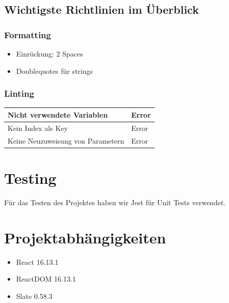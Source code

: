 \documentclass[a4paper, titlepage]{article}
\begin{document}
  \subsection{Wichtigste Richtlinien im Überblick}
  \subsubsection{Formatting}
  \begin{itemize}
    \item Einrückung: 2 Spaces
    \item Doublequotes für strings
  \end{itemize}
  \subsubsection{Linting}
  \begin{tabularx}{\textwidth}{|X|X|}
    \hline
    Nicht verwendete Variablen & Error \\
    \hline
    Kein Index als Key & Error \\
    \hline
    Keine Neuzuweisung von Parametern & Error \\
    \hline
  \end{tabularx}

  \section{Testing}
  Für das Testen des Projektes haben
  wir Jest für Unit Tests verwendet.

  \section{Projektabhängigkeiten}
  \begin{itemize}
    \item React 16.13.1
    \item ReactDOM 16.13.1
    \item Slate 0.58.3
  \end{itemize}
\end{document}
